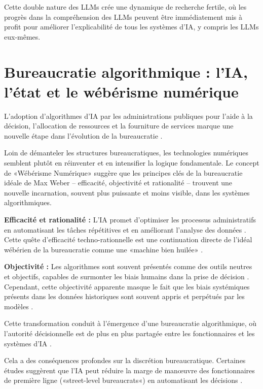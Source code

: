 Cette double nature des LLMs crée une dynamique de recherche fertile, où les progrès dans la compréhension des LLMs peuvent être immédiatement mis à profit pour améliorer l'explicabilité de tous les systèmes d'IA, y compris les LLMs eux-mêmes.

\section{Bureaucratie algorithmique : l'IA, l'état et le wébérisme numérique}
L'adoption d'algorithmes d'IA par les administrations publiques pour l'aide à la décision, l'allocation de ressources et la fourniture de services marque une nouvelle étape dans l'évolution de la bureaucratie \citet{Busuioc2021}.

Loin de démanteler les structures bureaucratiques, les technologies numériques semblent plutôt en réinventer et en intensifier la logique fondamentale. Le concept de «Wébérisme Numérique» \citet{Muellerleile2018} suggère que les principes clés de la bureaucratie idéale de Max Weber – efficacité, objectivité et rationalité – trouvent une nouvelle incarnation, souvent plus puissante et moins visible, dans les systèmes algorithmiques.

\textbf{Efficacité et rationalité :} L'IA promet d'optimiser les processus administratifs en automatisant les tâches répétitives et en améliorant l'analyse des données \citet{VanNoordt2022}. Cette quête d'efficacité techno-rationnelle est une continuation directe de l'idéal wébérien de la bureaucratie comme une «machine bien huilée» \citet{Weber1968}.

\textbf{Objectivité :} Les algorithmes sont souvent présentés comme des outils neutres et objectifs, capables de surmonter les biais humains dans la prise de décision \citet{Janssen2020}. Cependant, cette objectivité apparente masque le fait que les biais systémiques présents dans les données historiques sont souvent appris et perpétués par les modèles \citep{Busuioc2021, Diakopoulos2014}.

Cette transformation conduit à l'émergence d'une bureaucratie algorithmique, où l'autorité décisionnelle est de plus en plus partagée entre les fonctionnaires et les systèmes d'IA \citep{Vogl2020, Roehl2023}.

Cela a des conséquences profondes sur la discrétion bureaucratique. Certaines études suggèrent que l'IA peut réduire la marge de manœuvre des fonctionnaires de première ligne («street-level bureaucrats«) en automatisant les décisions \citep{Aviram2024, Giest2022}.

